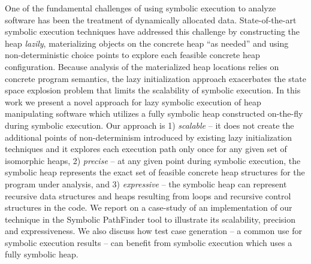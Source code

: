 One of the fundamental challenges of using symbolic execution
to analyze software has been the treatment of dynamically
allocated data.
State-of-the-art symbolic execution techniques 
have addressed this challenge by constructing the heap \emph{lazily},
materializing objects on the concrete heap ``as needed'' and
using non-deterministic choice points to explore each feasible
concrete heap configuration. Because analysis of the materialized
heap locations relies on concrete program semantics, the lazy
initialization approach exacerbates the state space explosion
problem that limits the scalability of symbolic execution.
In this work we present a novel approach for lazy symbolic execution
of heap manipulating software which utilizes 
a fully symbolic heap constructed on-the-fly during symbolic execution.
Our approach is 1) \emph{scalable} -- it does not
create the additional points of non-determinism
introduced by existing lazy initialization techniques and it explores
each execution path only once for any given set of isomorphic heaps,
2) \emph{precise} -- at any given point during symbolic execution, 
the symbolic heap represents the exact set of feasible
concrete heap structures for the program under analysis, and
3) \emph{expressive} -- the symbolic heap can represent recursive data structures 
and heaps resulting from loops and recursive control structures in the code. 
We report on a case-study of an implementation of our technique in the
Symbolic PathFinder tool to illustrate its scalability, precision
and expressiveness. We also discuss how test case generation -- a common
 use for symbolic execution results -- can benefit from symbolic
 execution which uses a fully symbolic heap.

